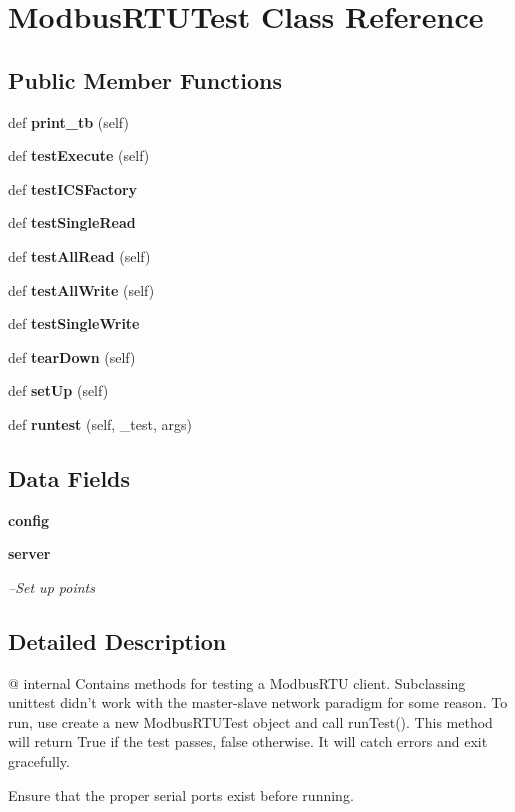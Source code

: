 \section{Modbus\+R\+T\+U\+Test Class Reference}
\label{classprotolibs_1_1ics__clients_1_1_modbus_r_t_u_test}
\subsection*{Public Member Functions}
\begin{DoxyCompactItemize}
\item 
def {\bf print\+\_\+tb} (self)
\item 
def {\bf test\+Execute} (self)
\item 
def {\bf test\+I\+C\+S\+Factory}
\item 
def {\bf test\+Single\+Read}
\item 
def {\bf test\+All\+Read} (self)
\item 
def {\bf test\+All\+Write} (self)
\item 
def {\bf test\+Single\+Write}
\item 
def {\bf tear\+Down} (self)
\item 
def {\bf set\+Up} (self)
\item 
def {\bf runtest} (self, \+\_\+test, args)
\end{DoxyCompactItemize}
\subsection*{Data Fields}
\begin{DoxyCompactItemize}
\item 
{\bf config}
\item 
{\bf server}
\begin{DoxyCompactList}\small\item\em --Set up points \end{DoxyCompactList}\end{DoxyCompactItemize}


\subsection{Detailed Description}
\begin{DoxyVerb}@ internal
   Contains methods for testing a ModbusRTU client. Subclassing unittest 
        didn't work  with the master-slave network paradigm for some reason.
    To run, use create a new ModbusRTUTest object and call runTest(). This
    method will return True if the test passes, false otherwise. It will
    catch errors and exit gracefully. 
    
    Ensure that the proper serial ports exist before running.
\end{DoxyVerb}
 

